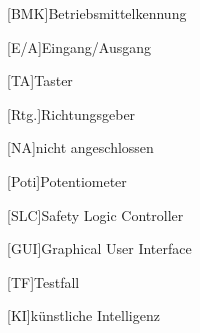 \documentclass[12pt, a4paper, twoside]{article} %
\begin{document}
\begin{acronym}[BMK]
	[BMK]{Betriebsmittelkennung}
\end{acronym}
\begin{acronym}[EA]
	[E/A]{Eingang/Ausgang}
\end{acronym}
\begin{acronym}[TA]
	[TA]{Taster}
\end{acronym}
\begin{acronym}[RTG]
	[Rtg.]{Richtungsgeber}
\end{acronym}
\begin{acronym}[NA]
	[NA]{nicht angeschlossen}
\end{acronym}
\begin{acronym}[Poti]
	[Poti]{Potentiometer}
\end{acronym}
\begin{acronym}[SLC]
	[SLC]{Safety Logic Controller}
\end{acronym}
\begin{acronym}[GUI]
	[GUI]{Graphical User Interface}
\end{acronym}
\begin{acronym}[TF]
	[TF]{Testfall}
\end{acronym}
\begin{acronym}[KI]
	[KI]{künstliche Intelligenz}
\end{acronym}
\clearpage

\pagestyle{fancy}



% 

% 

% 

\newpage




\newpage


\newpage

\end{document}
